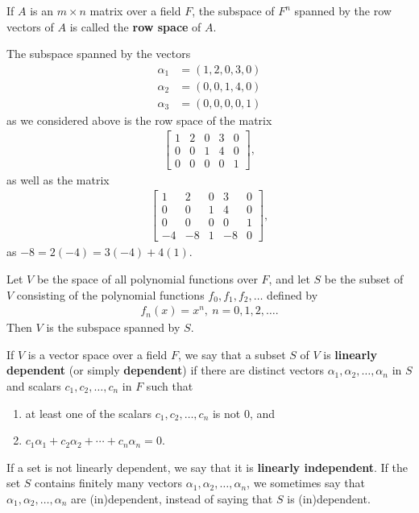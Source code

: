 \documentclass[12pt]{article}
\begin{document}
\begin{defn}
  If $A$ is an $m \times n$ matrix over a field $F$, the subspace of $F^{n}$ spanned
  by the row vectors of $A$ is called the \textbf{row space} of $A$.
\end{defn}

\begin{exm}
  The subspace spanned by the vectors
  \begin{align*}
    \alpha_1 &= (1,2,0,3,0)\\
    \alpha_2 &= (0,0,1,4,0)\\
    \alpha_3 &= (0,0,0,0,1)
  \end{align*}
  as we considered above is the row space of the matrix
  \begin{align*}
    \begin{bmatrix}
      1 & 2 & 0 & 3 & 0\\
      0 & 0 & 1 & 4 & 0\\
      0 & 0 & 0 & 0 & 1
    \end{bmatrix},
  \end{align*}
  as well as the matrix
  \begin{align*}
    \begin{bmatrix}
      1  & 2  & 0 & 3  & 0\\
      0  & 0  & 1 & 4  & 0\\
      0  & 0  & 0 & 0  & 1\\
      -4 & -8 & 1 & -8 & 0
    \end{bmatrix},
  \end{align*}
  as $-8 = 2(-4) = 3(-4) + 4(1)$.
\end{exm}

\begin{exm}
  Let $V$ be the space of all polynomial functions over $F$, and let $S$ be the
  subset of $V$ consisting of the polynomial functions $f_0,f_1,f_2,\ldots$ defined
  by
  \begin{align*}
    f_n(x) = x^n,\ n = 0,1,2,\ldots.
  \end{align*}
  Then $V$ is the subspace spanned by $S$.
\end{exm}

\begin{defn}
  If $V$ is a vector space over a field $F$, we say that a subset $S$ of $V$ is
  \textbf{linearly dependent} (or simply \textbf{dependent}) if there are distinct
  vectors $\alpha_1,\alpha_2,\ldots,\alpha_n$ in $S$ and scalars $c_1,c_2,\ldots,c_n$
  in $F$ such that
  \begin{enumerate}
    \item
      at least one of the scalars $c_1,c_2,\ldots,c_n$ is not $0$, and
    \item
      $c_1\alpha_1 + c_2\alpha_2 + \cdots + c_n\alpha_n = 0$.
  \end{enumerate}

  If a set is not linearly dependent, we say that it is \textbf{linearly
  independent}. If the set $S$ contains finitely many vectors
  $\alpha_1,\alpha_2,\ldots,\alpha_n$, we sometimes say that
  $\alpha_1,\alpha_2,\ldots,\alpha_n$ are (in)dependent, instead of saying that $S$
  is (in)dependent.
\end{defn}
\end{document}
